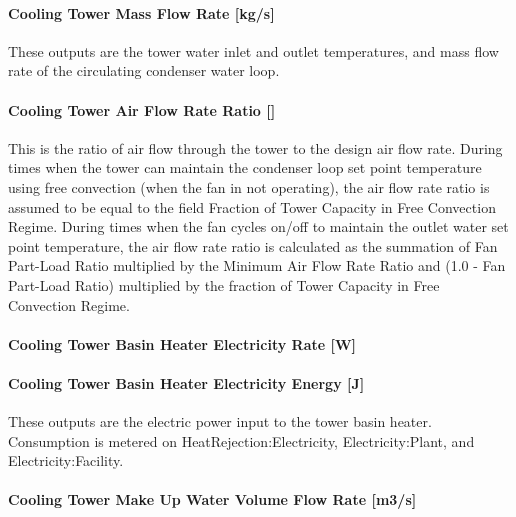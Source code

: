\paragraph{Cooling Tower Mass Flow Rate {[}kg/s{]}}\label{cooling-tower-mass-flow-rate-kgs-3}

These outputs are the tower water inlet and outlet temperatures, and mass flow rate of the circulating condenser water loop.

\paragraph{Cooling Tower Air Flow Rate Ratio {[]}}\label{cooling-tower-air-flow-rate-ratio}

This is the ratio of air flow through the tower to the design air flow rate. During times when the tower can maintain the condenser loop set point temperature using free convection (when the fan in not operating), the air flow rate ratio is assumed to be equal to the field Fraction of Tower Capacity in Free Convection Regime. During times when the fan cycles on/off to maintain the outlet water set point temperature, the air flow rate ratio is calculated as the summation of Fan Part-Load Ratio multiplied by the Minimum Air Flow Rate Ratio and (1.0 - Fan Part-Load Ratio) multiplied by the fraction of Tower Capacity in Free Convection Regime.

\paragraph{Cooling Tower Basin Heater Electricity Rate {[}W{]}}\label{cooling-tower-basin-heater-electric-power-w-3}

\paragraph{Cooling Tower Basin Heater Electricity Energy {[}J{]}}\label{cooling-tower-basin-heater-electric-energy-j-3}

These outputs are the electric power input to the tower basin heater. Consumption is metered on HeatRejection:Electricity, Electricity:Plant, and Electricity:Facility.

\paragraph{Cooling Tower Make Up Water Volume Flow Rate {[}m3/s{]}}\label{cooling-tower-make-up-water-volume-flow-rate-m3s-3}

